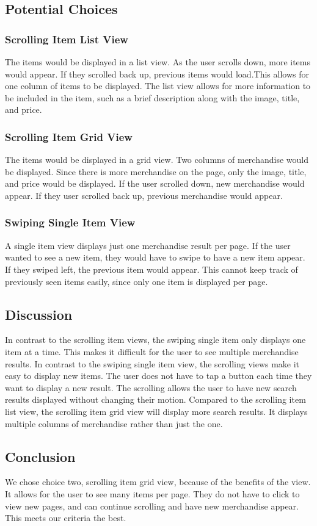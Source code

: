 \documentclass[onecolumn, draftclsnofoot,10pt, compsoc]{IEEEtran}
\begin{document}
\subsection{Potential Choices}

\subsubsection{Scrolling Item List View}
The items would be displayed in a list view. As the user scrolls down, more items would appear. If they scrolled back up, previous items would load.This allows for one column of items to be displayed. The list view allows for more information to be included in the item, such as a brief description along with the image, title, and price.

\subsubsection{Scrolling Item Grid View}
The items would be displayed in a grid view. Two columns of merchandise would be displayed. Since there is more merchandise on the page, only the image, title, and price would be displayed. If the user scrolled down, new merchandise would appear. If they user scrolled back up, previous merchandise would appear.

\subsubsection{Swiping Single Item View}
A single item view displays just one merchandise result per page. If the user wanted to see a new item, they would have to swipe to have a new item appear. If they swiped left, the previous item would appear. This cannot keep track of previously seen items easily, since only one item is displayed per page.

\subsection{Discussion}
In contrast to the scrolling item views, the swiping single item only displays one item at a time. This makes it difficult for the user to see multiple merchandise results. In contrast to the swiping single item view, the scrolling views make it easy to display new items. The user does not have to tap a button each time they want to display a new result. The scrolling allows the user to have new search results displayed without changing their motion. Compared to the scrolling item list view, the scrolling item grid view will display more search results. It displays multiple columns of merchandise rather than just the one.

\subsection{Conclusion}
We chose choice two, scrolling item grid view, because of the benefits of the view. It allows for the user to see many items per page. They do not have to click to view new pages, and can continue scrolling and have new merchandise appear. This meets our criteria the best.

 

\end{document}
